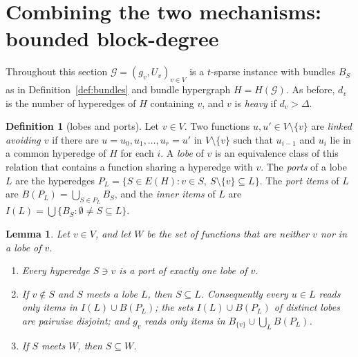 \documentclass[11pt,letterpaper]{article}
\newtheorem{lemma}[theorem]{Lemma}
\theoremstyle{definition}
\newtheorem{definition}[theorem]{Definition}
\newcommand{\cG}{\mathcal{G}}
\begin{document}
\section{Combining the two mechanisms: bounded block-degree}\label{sec:combine}

Throughout this section $\cG=(g_v,U_v)_{v\in V}$ is a $t$-sparse instance with bundles $B_S$ as in
Definition~\ref{def:bundles} and bundle hypergraph $H=H(\cG)$. As before, $d_v$ is the number of
hyperedges of $H$ containing $v$, and $v$ is \emph{heavy} if $d_v>\Delta$.

\begin{definition}[lobes and ports]\label{def:lobes}
Let $v\in V$. Two functions $u,u'\in V\setminus\{v\}$ are \emph{linked avoiding $v$} if there are
$u=u_0,u_1,\dots,u_r=u'$ in $V\setminus\{v\}$ such that $u_{i-1}$ and $u_i$ lie in a common
hyperedge of $H$ for each $i$. A \emph{lobe} of $v$ is an equivalence class of this relation that
contains a function sharing a hyperedge with $v$. The \emph{ports} of a lobe $L$ are the hyperedges
$P_L=\{S\in E(H):v\in S,\ S\setminus\{v\}\subseteq L\}$. The \emph{port items} of $L$ are
$B(P_L)=\bigcup_{S\in P_L}B_S$, and the \emph{inner items} of $L$ are
$I(L)=\bigcup\{B_S:\emptyset\ne S\subseteq L\}$.
\end{definition}

\begin{lemma}\label{lem:lobes}
Let $v\in V$, and let $W$ be the set of functions that are neither $v$ nor in a lobe of $v$.
\begin{enumerate}[label=(\alph*),itemsep=0pt]
\item Every hyperedge $S\ni v$ is a port of exactly one lobe of $v$.
\item If $v\notin S$ and $S$ meets a lobe $L$, then $S\subseteq L$. Consequently every $u\in L$
reads only items in $I(L)\cup B(P_L)$; the sets $I(L)\cup B(P_L)$ of distinct lobes are pairwise
disjoint; and $g_v$ reads only items in $B_{\{v\}}\cup\bigcup_LB(P_L)$.
\item If $S$ meets $W$, then $S\subseteq W$.
\end{enumerate}
\end{lemma}
\end{document}
